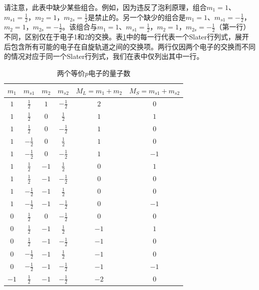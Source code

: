     请注意，此表中缺少某些组合。例如，因为违反了泡利原理，组合$m_1=1$、$m_{s1} = \frac{1}{2}$，$m_2=1$，$m_{2s} = \frac{1}{2}$是禁止的。另一个缺少的组合是$m_1=1$、$m_{s1} = -\frac{1}{2}$，$m_2=1$，$m_{2s} = -\frac{1}{2}$。该组合与$m_1=1$、$m_{s1} = \frac{1}{2}$，$m_2=1$，$m_{2s} = -\frac{1}{2}$（第一行）不同，区别仅在于电子1和2的交换。表\ref{tab:11.1}中的每一行代表一个Slater行列式，展开后包含所有可能的电子在自旋轨道之间的交换项。两行仅因两个电子的交换而不同的情况对应于同一个Slater行列式，我们在表中仅列出其中一行。
    \begin{table}[htbp]
        \centering
        \begin{tabular}{|c|c|c|c|c|c|}
            \hline
            $m_1$ & $m_{s1}$ & $m_2$ & $m_{s2}$ & $M_L = m_1 + m_2$ & $M_S = m_{s1} + m_{s2}$ \\
            \hline
            $1$ & $\frac{1}{2}$ & $1$ & $-\frac{1}{2}$ & $2$ & $0$ \\
            \hline
            $1$ & $\frac{1}{2}$ & $0$ & $\frac{1}{2}$ & $1$ & $1$ \\
            \hline
            $1$ & $\frac{1}{2}$ & $0$ & $-\frac{1}{2}$ & $1$ & $0$ \\
            \hline
            $1$ & $-\frac{1}{2}$ & $0$ & $\frac{1}{2}$ & $1$ & $0$ \\
            \hline
            $1$ & $-\frac{1}{2}$ & $0$ & $-\frac{1}{2}$ & $1$ & $-1$ \\
            \hline
            $1$ & $\frac{1}{2}$ & $-1$ & $\frac{1}{2}$ & $0$ & $1$ \\
            \hline
            $1$ & $\frac{1}{2}$ & $-1$ & $-\frac{1}{2}$ & $0$ & $0$ \\
            \hline
            $1$ & $-\frac{1}{2}$ & $-1$ & $\frac{1}{2}$ & $0$ & $0$ \\
            \hline
            $1$ & $-\frac{1}{2}$ & $-1$ & $-\frac{1}{2}$ & $0$ & $-1$ \\
            \hline
            $0$ & $\frac{1}{2}$ & $0$ & $-\frac{1}{2}$ & $0$ & $0$ \\
            \hline
            $0$ & $\frac{1}{2}$ & $-1$ & $\frac{1}{2}$ & $-1$ & $1$ \\
            \hline
            $0$ & $\frac{1}{2}$ & $-1$ & $-\frac{1}{2}$ & $-1$ & $0$ \\
            \hline
            $0$ & $-\frac{1}{2}$ & $-1$ & $\frac{1}{2}$ & $-1$ & $0$ \\
            \hline
            $0$ & $-\frac{1}{2}$ & $-1$ & $-\frac{1}{2}$ & $-1$ & $-1$ \\
            \hline
            $-1$ & $\frac{1}{2}$ & $-1$ & $-\frac{1}{2}$ & $-2$ & $0$ \\
            \hline
        \end{tabular}
        \caption{两个等价$p$电子的量子数}
        \label{tab:11.1}
    \end{table}

